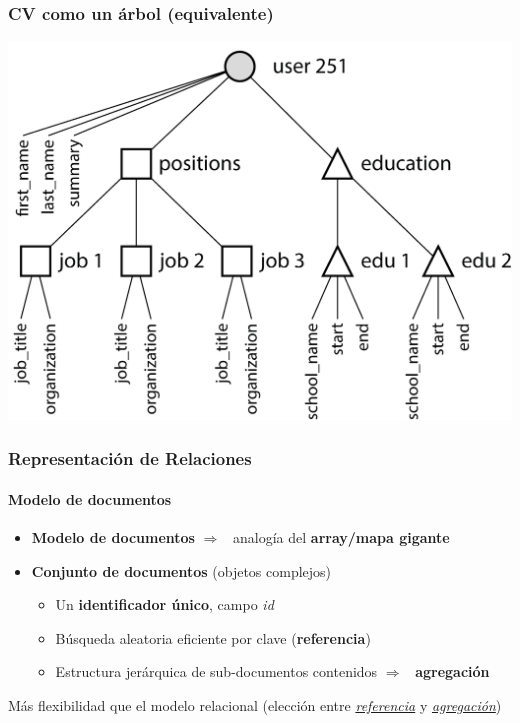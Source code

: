 \documentclass[14pt]{beamer}
\newcommand{\ra}{{\color{blue} $\Rightarrow${}~{}}}
\begin{document}
\begin{frame}
  \frametitle{CV como un árbol (equivalente)}
\centering\includegraphics[height=.85\textheight]{img/tree}
\end{frame}

\begin{frame}[allowframebreaks]
  \frametitle{Representación de Relaciones}
\framesubtitle{Modelo de documentos}
\begin{itemize}
\item {\bf Modelo de documentos} \ra{} analogía del {\bf array/mapa
    gigante}
\item {\bf Conjunto de documentos} (objetos complejos)
  \begin{itemize}
\item Un {\bf identificador único}, campo {\em id\/}
\item Búsqueda aleatoria eficiente por clave ({\bf referencia})
\item Estructura jerárquica de sub-documentos contenidos \ra{}
  {\bf agregación}
\end{itemize}
\end{itemize}


\begin{alertblock}{}
  Más flexibilidad que el modelo relacional (elección entre \underline{\em
    referencia} y \underline{\em agregación})
\end{alertblock}

\end{frame}
\end{document}
